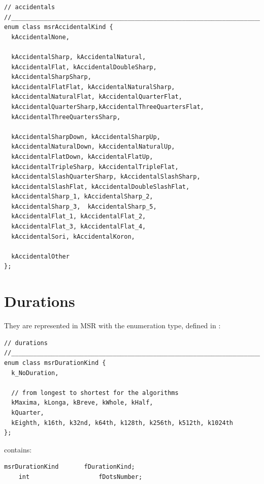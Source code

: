 \begin{lstlisting}[language=CPlusPlus]
// accidentals
//______________________________________________________________________________
enum class msrAccidentalKind {
  kAccidentalNone,

  kAccidentalSharp, kAccidentalNatural,
  kAccidentalFlat, kAccidentalDoubleSharp,
  kAccidentalSharpSharp,
  kAccidentalFlatFlat, kAccidentalNaturalSharp,
  kAccidentalNaturalFlat, kAccidentalQuarterFlat,
  kAccidentalQuarterSharp,kAccidentalThreeQuartersFlat,
  kAccidentalThreeQuartersSharp,

  kAccidentalSharpDown, kAccidentalSharpUp,
  kAccidentalNaturalDown, kAccidentalNaturalUp,
  kAccidentalFlatDown, kAccidentalFlatUp,
  kAccidentalTripleSharp, kAccidentalTripleFlat,
  kAccidentalSlashQuarterSharp, kAccidentalSlashSharp,
  kAccidentalSlashFlat, kAccidentalDoubleSlashFlat,
  kAccidentalSharp_1, kAccidentalSharp_2,
  kAccidentalSharp_3,  kAccidentalSharp_5,
  kAccidentalFlat_1, kAccidentalFlat_2,
  kAccidentalFlat_3, kAccidentalFlat_4,
  kAccidentalSori, kAccidentalKoron,

  kAccidentalOther
};
\end{lstlisting}


\section{Durations}\label{Durations}

They are represented in MSR with the  enumeration type, defined in :
\begin{lstlisting}[language=CPlusPlus]
// durations
//______________________________________________________________________________
enum class msrDurationKind {
  k_NoDuration,

  // from longest to shortest for the algorithms
  kMaxima, kLonga, kBreve, kWhole, kHalf,
  kQuarter,
  kEighth, k16th, k32nd, k64th, k128th, k256th, k512th, k1024th
};
\end{lstlisting}

 contains:
\begin{lstlisting}[language=CPlusPlus]
    msrDurationKind       fDurationKind;
    int                   fDotsNumber;
\end{lstlisting}



